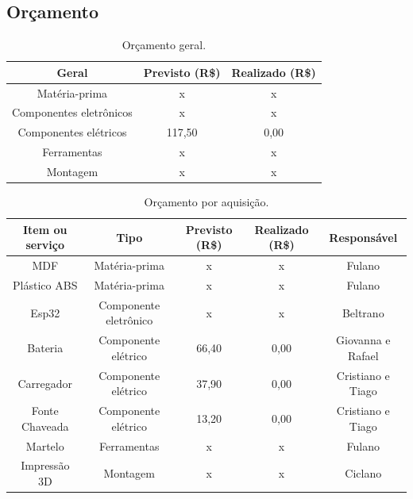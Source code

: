 \begin{landscape}

\chapter{Orçamento}

\begin{table}[htpb]
\begin{center}
\caption{Orçamento geral.}
\begin{tabular}{|c|c|c|}
\hline
\textbf{Geral}          & \textbf{Previsto (R\$)} & \textbf{Realizado (R\$)} \\ \hline
Matéria-prima           & x                       & x                        \\ \hline
Componentes eletrônicos & x                       & x                        \\ \hline
Componentes elétricos   & 117,50                  & 0,00                     \\ \hline
Ferramentas             & x                       & x                        \\ \hline
Montagem                & x                       & x                        \\ \hline
\end{tabular}
\end{center}
\end{table}

\begin{table}[htpb]
\begin{center}
\caption{Orçamento por aquisição.}
\begin{tabular}{|c|c|c|c|c|}
\hline
\textbf{Item ou serviço} & \textbf{Tipo} & \textbf{Previsto (R\$)} & \textbf{Realizado (R\$)} & \textbf{Responsável} \\ \hline
MDF              & Matéria-prima            & x         & x         & Fulano                   \\ \hline
Plástico ABS     & Matéria-prima            & x         & x         & Fulano                   \\ \hline
Esp32            & Componente eletrônico    & x         & x         & Beltrano                 \\ \hline
Bateria          & Componente elétrico      & 66,40     & 0,00      & Giovanna e Rafael        \\ \hline
Carregador       & Componente elétrico      & 37,90     & 0,00      & Cristiano e Tiago        \\ \hline
Fonte Chaveada   & Componente elétrico      & 13,20     & 0,00      & Cristiano e Tiago        \\ \hline
Martelo          & Ferramentas              & x         & x         & Fulano                   \\ \hline
Impressão 3D     & Montagem                 & x         & x         & Ciclano                  \\ \hline
\end{tabular}
\end{center}
\end{table}


\end{landscape}
